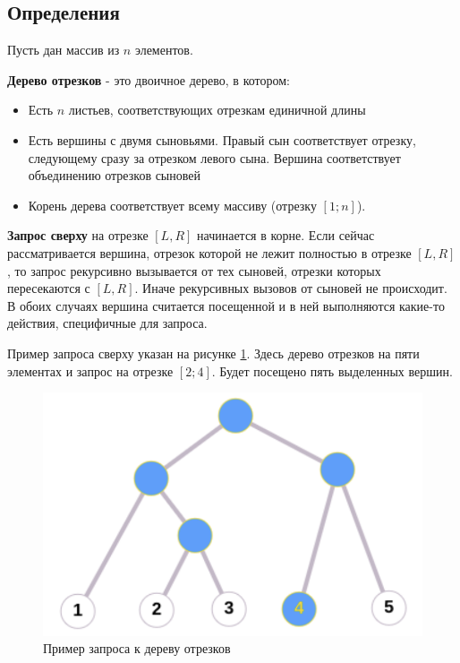 \subsection{Определения}

Пусть дан массив из $n$ элементов.

\textbf{Дерево отрезков} - это двоичное дерево, в котором:

\begin{itemize}
    \item Есть $n$ листьев, соответствующих отрезкам единичной длины
    \item Есть вершины с двумя сыновьями. Правый сын соответствует отрезку,
    следующему сразу за отрезком левого сына. Вершина соответствует
    объединению отрезков сыновей
    \item Корень дерева соответствует всему массиву (отрезку $[1; n]$).
\end{itemize}

\textbf{Запрос сверху} на отрезке $[L, R]$ начинается в корне.
Если сейчас рассматривается вершина, отрезок которой не лежит полностью в
отрезке $[L, R]$, то запрос рекурсивно вызывается от тех сыновей, отрезки которых
пересекаются с $[L, R]$. Иначе рекурсивных вызовов от сыновей не происходит.
В обоих случаях вершина считается посещенной и в ней выполняются какие-то
действия, специфичные для запроса.

Пример запроса сверху указан на рисунке \ref{fig:segtree_example}. Здесь дерево отрезков на пяти элементах и запрос на отрезке $[2;4]$. Будет посещено пять выделенных вершин.

\begin{figure}[hbt!]
    \centering
    \includegraphics[scale=0.28]{images/segtree_example.png}
    \caption{Пример запроса к дереву отрезков}
    \label{fig:segtree_example}
\end{figure}

